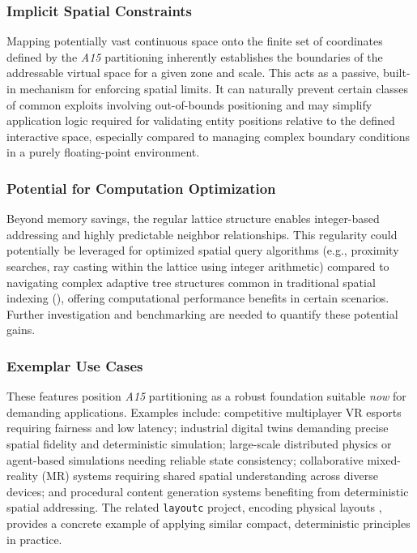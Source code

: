 \documentclass[10pt]{article}
\def\AAAB{\textit{A15}}
\begin{document}
\subsubsection{Implicit Spatial Constraints}\label{subsubsec-apps-constraints}
Mapping potentially vast continuous space onto the finite set of coordinates defined by the \AAAB{} partitioning inherently establishes the boundaries of the addressable virtual space for a given zone and scale. This acts as a passive, built-in mechanism for enforcing spatial limits. It can naturally prevent certain classes of common exploits involving out-of-bounds positioning and may simplify application logic required for validating entity positions relative to the defined interactive space, especially compared to managing complex boundary conditions in a purely floating-point environment.

\subsubsection{Potential for Computation Optimization}\label{subsubsec-apps-optimization}
Beyond memory savings, the regular lattice structure enables integer-based addressing and highly predictable neighbor relationships. This regularity could potentially be leveraged for optimized spatial query algorithms (e.g., proximity searches, ray casting within the lattice using integer arithmetic) compared to navigating complex adaptive tree structures common in traditional spatial indexing (), offering computational performance benefits in certain scenarios. Further investigation and benchmarking are needed to quantify these potential gains.

\subsubsection{Exemplar Use Cases}\label{subsubsec-apps-usecases}
These features position \AAAB{} partitioning as a robust foundation suitable \emph{now} for demanding applications. Examples include: competitive multiplayer VR esports requiring fairness and low latency; industrial digital twins demanding precise spatial fidelity and deterministic simulation; large-scale distributed physics or agent-based simulations needing reliable state consistency; collaborative mixed-reality (MR) systems requiring shared spatial understanding across diverse devices; and procedural content generation systems benefiting from deterministic spatial addressing. The related \texttt{layoutc} project, encoding physical layouts \cite{Risinger2024Layoutc}, provides a concrete example of applying similar compact, deterministic principles in practice.
\end{document}

